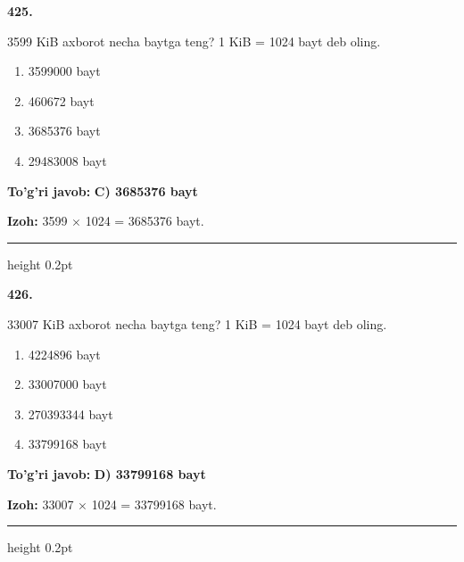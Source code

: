 \documentclass[10pt,a4paper,oneside]{article}
\begin{document}
\noindent\textbf{\color{ink}425.}
\par
3599 KiB axborot necha baytga teng? 1 KiB = 1024 bayt deb oling.
\begin{enumerate}[label=\Alph*),leftmargin=9mm]
\item 3599000 bayt
\item 460672 bayt
\item 3685376 bayt
\item 29483008 bayt
\end{enumerate}
\begin{tcolorbox}[enhanced,breakable,colback=teal!4,colframe=teal!50!black,boxrule=0.5pt,arc=1.1mm,left=3mm,right=3mm,top=1.7mm,bottom=1.7mm,before skip=2mm,after skip=2mm]
\textbf{\color{teal}To'g'ri javob:} \textbf{C) 3685376 bayt}
\par\smallskip
\textbf{Izoh:} 3599 \ensuremath{\times} 1024 = 3685376 bayt.
\end{tcolorbox}
\vspace{2mm}\hrule height 0.2pt \vspace{3mm}

\noindent\textbf{\color{ink}426.}
\par
33007 KiB axborot necha baytga teng? 1 KiB = 1024 bayt deb oling.
\begin{enumerate}[label=\Alph*),leftmargin=9mm]
\item 4224896 bayt
\item 33007000 bayt
\item 270393344 bayt
\item 33799168 bayt
\end{enumerate}
\begin{tcolorbox}[enhanced,breakable,colback=teal!4,colframe=teal!50!black,boxrule=0.5pt,arc=1.1mm,left=3mm,right=3mm,top=1.7mm,bottom=1.7mm,before skip=2mm,after skip=2mm]
\textbf{\color{teal}To'g'ri javob:} \textbf{D) 33799168 bayt}
\par\smallskip
\textbf{Izoh:} 33007 \ensuremath{\times} 1024 = 33799168 bayt.
\end{tcolorbox}
\vspace{2mm}\hrule height 0.2pt \vspace{3mm}
\end{document}
